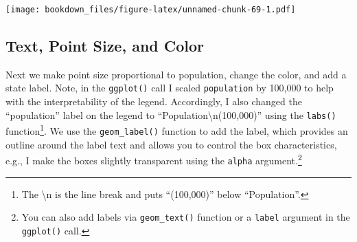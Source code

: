 \documentclass[]{krantz}
\makeatletter
\newenvironment{Shaded}{\begin{snugshade}}{\end{snugshade}}
\newcommand{\KeywordTok}[1]{\textcolor[rgb]{0.27,0.27,0.27}{\textbf{#1}}}
\newcommand{\DataTypeTok}[1]{\textcolor[rgb]{0.27,0.27,0.27}{#1}}
\newcommand{\DecValTok}[1]{\textcolor[rgb]{0.06,0.06,0.06}{#1}}
\newcommand{\StringTok}[1]{\textcolor[rgb]{0.5,0.5,0.5}{#1}}
\newcommand{\OperatorTok}[1]{\textcolor[rgb]{0.43,0.43,0.43}{\textbf{#1}}}
\newcommand{\NormalTok}[1]{#1}
\newenvironment{kframe}{%
\medskip{}
\setlength{\fboxsep}{.8em}
 \def\at@end@of@kframe{}%
 \ifinner\ifhmode%
  \def\at@end@of@kframe{\end{minipage}}%
  \begin{minipage}{\columnwidth}%
 \fi\fi%
 \def\FrameCommand##1{\hskip\@totalleftmargin \hskip-\fboxsep
 \colorbox{shadecolor}{##1}\hskip-\fboxsep
     \hskip-\linewidth \hskip-\@totalleftmargin \hskip\columnwidth}%
 \MakeFramed {\advance\hsize-\width
   \@totalleftmargin\z@ \linewidth\hsize
   \@setminipage}}%
 {\par\unskip\endMakeFramed%
 \at@end@of@kframe}
\renewenvironment{Shaded}{\begin{kframe}}{\end{kframe}}
\makeatother
\begin{document}
\begin{Shaded}
\end{Shaded}

\texttt{[image: bookdown\_files/figure-latex/unnamed-chunk-69-1.pdf]}

\subsection{Text, Point Size, and
Color}\label{text-point-size-and-color}

Next we make point size proportional to population, change the color,
and add a state label. Note, in the \texttt{ggplot()} call I scaled
\texttt{population} by 100,000 to help with the interpretability of the
legend. Accordingly, I also changed the ``population'' label on the
legend to ``Population\textbackslash{}n(100,000)'' using the
\texttt{labs()} function\footnote{The \textbackslash{}n is the line
  break and puts ``(100,000)'' below ``Population''.}. We use the
\texttt{geom\_label()} function to add the label, which provides an
outline around the label text and allows you to control the box
characteristics, e.g., I make the boxes slightly transparent using the
\texttt{alpha} argument.\footnote{You can also add labels via
  \texttt{geom\_text()} function or a \texttt{label} argument in the
  \texttt{ggplot()} call.}
\end{document}
